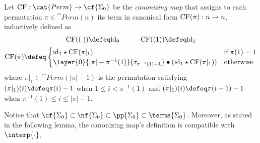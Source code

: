 \begin{definition}
    Let $\textup{CF}:\cat{Perm}\to \cf{\Sigma_0}$ be the \emph{canonizing map} that assigns to each permutation $\pi\in\cat{Perm}(n)$ its term in canonical form $\textup{CF}(\pi):n\to n$, inductively defined as
    \vspace{-0.5em}
    \begin{gather*}
        \textup{CF}((\;))\defeq \textup{id}_0 \hspace{3em}
        \textup{CF}((1))\defeq \textup{id}_1 \\
        \textup{CF}(\pi)\defeq\begin{cases}
            \textup{id}_1\star\textup{CF}(\pi|_1) & \text{if}\;\pi(1)=1\\
            \layer{0}{|\pi|-\pi^{-1}(1)}{\tau_{\pi^{-1}(1)-1}}\bullet(\textup{id}_1\star\textup{CF}(\pi|_1)) & \text{otherwise}
        \end{cases} 
    \end{gather*}
    where $\pi|_1\in\cat{Perm}(|\pi|-1)$ is the permutation satisfying $(\pi|_1)(i)\defeq\pi(i)-1$ when $1\le i<\pi^{-1}(1)$ and $(\pi|_1)(i)\defeq\pi(i+1)-1$ when $\pi^{-1}(1)\le i\le|\pi|-1$.
\end{definition}

Notice that $\cf{\Sigma_0}\subset\nf{\Sigma_0}\subset\pp{\Sigma_0}\subset\terms{\Sigma_0}$. Moreover, as stated in the following lemma, the canonizing map's definition is compatible with $\interp{\cdot}$.

